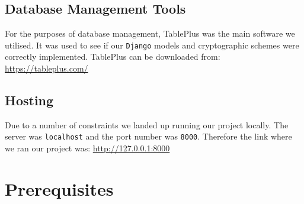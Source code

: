\documentclass[a4paper, 12pt, titlepage]{report}
\begin{document}
\subsection{Database Management Tools}
For the purposes of database management, TablePlus was the main software we utilised. It was used to see if our \texttt{Django} models and cryptographic schemes were correctly implemented. TablePlus can be downloaded from: \url{https://tableplus.com/}
\subsection{Hosting}
Due to a number of constraints we landed up running our project locally. The server was \texttt{localhost} and the port number was \texttt{8000}. Therefore the link where we ran our project was:
\url{http://127.0.0.1:8000}
\section{Prerequisites}
\end{document}
